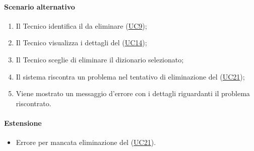 \paragraph*{Scenario alternativo}
\begin{enumerate}
  \item Il Tecnico identifica il  da eliminare (\hyperref[UC9]{UC9});
  \item Il Tecnico visualizza i dettagli del  (\hyperref[UC14]{UC14});  
  \item Il Tecnico sceglie di eliminare il dizionario selezionato;
  \item Il sistema riscontra un problema nel tentativo di eliminazione del  (\hyperref[UC21]{UC21});
  \item Viene mostrato un messaggio d'errore con i dettagli riguardanti il problema riscontrato.
\end{enumerate}

\paragraph*{Estensione}
\begin{itemize}
  \item Errore per mancata eliminazione del  (\hyperref[UC21]{UC21}).
\end{itemize}
